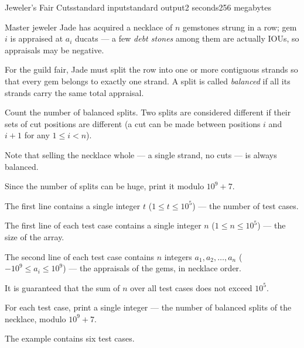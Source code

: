 \begin{problem}{Jeweler's Fair Cuts}{standard input}{standard output}{2 seconds}{256 megabytes}

Master jeweler Jade has acquired a necklace of $n$ gemstones strung in a row; gem $i$ is appraised at $a_i$ ducats --- a few \emph{debt stones} among them are actually IOUs, so appraisals may be negative.

For the guild fair, Jade must split the row into one or more contiguous strands so that every gem belongs to exactly one strand. A split is called \emph{balanced} if all its strands carry the same total appraisal.

Count the number of balanced splits. Two splits are considered different if their sets of cut positions are different (a cut can be made between positions $i$ and $i+1$ for any $1 \le i < n$).

Note that selling the necklace whole --- a single strand, no cuts --- is always balanced.

Since the number of splits can be huge, print it modulo $10^9 + 7$.


\InputFile
The first line contains a single integer $t$ ($1 \le t \le 10^5$) --- the number of test cases.

The first line of each test case contains a single integer $n$ ($1 \le n \le 10^5$) --- the size of the array.

The second line of each test case contains $n$ integers $a_1, a_2, \ldots, a_n$ ($-10^9 \le a_i \le 10^9$) --- the appraisals of the gems, in necklace order.

It is guaranteed that the sum of $n$ over all test cases does not exceed $10^5$.


\OutputFile
For each test case, print a single integer --- the number of balanced splits of the necklace, modulo $10^9 + 7$.


\Example

\begin{example}
%
\end{example}

\Note
The example contains six test cases.


\end{problem}
